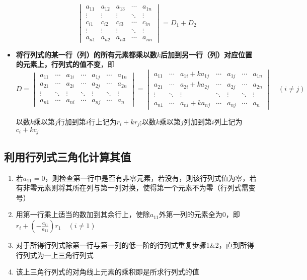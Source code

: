 \documentclass[UTF8]{ctexart}
\begin{document}
\begin{itemize}
{\[\begin{vmatrix}
  a_{11}&a_{12}&a_{13}&\cdots&a_{1n}\\
  \vdots&\vdots&\vdots&\ddots&\vdots\\
  c_{i1}&c_{i2}&c_{i3}&\cdots&c_{in}\\
  \vdots&\vdots&\vdots&\ddots&\vdots\\
  a_{n1}&a_{n2}&a_{n3}&\cdots&a_{nn}
  \end{vmatrix}=D_1+D_2
  \]
  }
  \item \textbf{将行列式的某一行（列）的所有元素都乘以数$k$后加到另一行（列）对应位置的元素上，行列式的值不变}，即
  \[
  D=\begin{vmatrix}
  a_{11}&\cdots&a_{1i}&\cdots&a_{1j}&\cdots&a_{1n}\\
  a_{21}&\cdots&a_{2i}&\cdots&a_{2j}&\cdots&a_{2n}\\
  \vdots&\ddots&\vdots&\ddots&\vdots&\ddots&\vdots\\
  a_{n1}&\cdots&a_{ni}&\cdots&a_{nj}&\cdots&a_{n}
  \end{vmatrix}=\begin{vmatrix}
  a_{11}&\cdots&a_{1i}+ka_{1j}&\cdots&a_{1j}&\cdots&a_{1n}\\
  a_{21}&\cdots&a_{2i}+ka_{2j}&\cdots&a_{2j}&\cdots&a_{2n}\\
  \vdots&\ddots&\vdots&\ddots&\vdots&\ddots&\vdots\\
  a_{n1}&\cdots&a_{ni}+ka_{nj}&\cdots&a_{nj}&\cdots&a_{n}
  \end{vmatrix}\quad(i\ne j)
  \]

  以数$k$乘以第$j$行加到第$i$行上记为$r_i+kr_j$;以数$k$乘以第$j$列加到第$i$列上记为$c_i+kc_j$
\end{itemize}

\subsection*{利用行列式三角化计算其值}
\begin{enumerate}
  \item 若$a_{11}=0$，则检查第一行中是否有非零元素，若没有，则该行列式值为零，若有非零元素则将其所在列与第一列对换，使得第一个元素不为零（行列式需变号）
  \item 用第一行乘上适当的数加到其余行上，使除$a_{11}$外第一列的元素全为$0$，即$\displaystyle r_i+(-\frac{a_{i1}}{a_{11}})r_1\quad(i\ne1)$
  \item 对于所得行列式除第一行与第一列的低一阶的行列式重复步骤1\&2，直到所得行列式为一上三角行列式
  \item 该上三角行列式的对角线上元素的乘积即是所求行列式的值
\end{enumerate}
\end{document}

